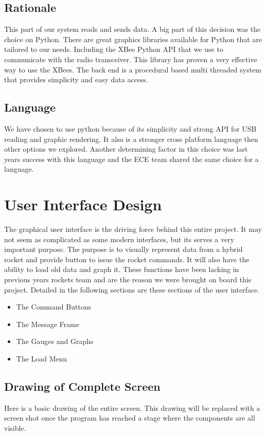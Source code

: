 \documentclass[10pt,draftclsnofoot,onecolumn,compsoc]{IEEEtran}
\begin{document}
\subsection{Rationale}
This part of our system reads and sends data. A big part of this decision was the choice on Python. There are great graphics libraries available for Python that are tailored to our needs. Including the XBee Python API that we use to communicate with the radio transceiver. This library has proven a very effective way to use the XBees. The back end is a procedural based multi threaded system that provides simplicity and easy data access.

\subsection{Language}
We have chosen to use python because of its simplicity and strong API for USB reading and graphic rendering. It also is a stronger cross platform language then other options we explored. Another determining factor in this choice was last years success with this language and the ECE team shared the same choice for a language.

\section{User Interface Design}
The graphical user interface is the driving force behind this entire project. It may not seem as complicated as some modern interfaces, but its serves a very important purpose. The purpose is to visually represent data from a hybrid rocket and provide button to issue the rocket commands. It will also have the ability to load old data and graph it. These functions have been lacking in previous years rockets team and are the reason we were brought on board this project. Detailed in the following sections are these sections of the user interface. \par

\begin{itemize}
\item The Command Buttons
\item The Message Frame
\item The Gauges and  Graphs
\item The Load Menu
\end{itemize}

\subsection{Drawing of Complete Screen}
Here is a basic drawing of the entire screen. This drawing will be replaced with a screen shot once the program has reached a stage where the components are all visible.\par
\end{document}
